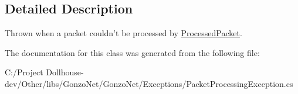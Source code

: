 \subsection{Detailed Description}
Thrown when a packet couldn't be processed by \hyperlink{class_gonzo_net_1_1_processed_packet}{Processed\+Packet}. 



The documentation for this class was generated from the following file\+:\begin{DoxyCompactItemize}
\item 
C\+:/\+Project Dollhouse-\/dev/\+Other/libs/\+Gonzo\+Net/\+Gonzo\+Net/\+Exceptions/Packet\+Processing\+Exception.\+cs\end{DoxyCompactItemize}
